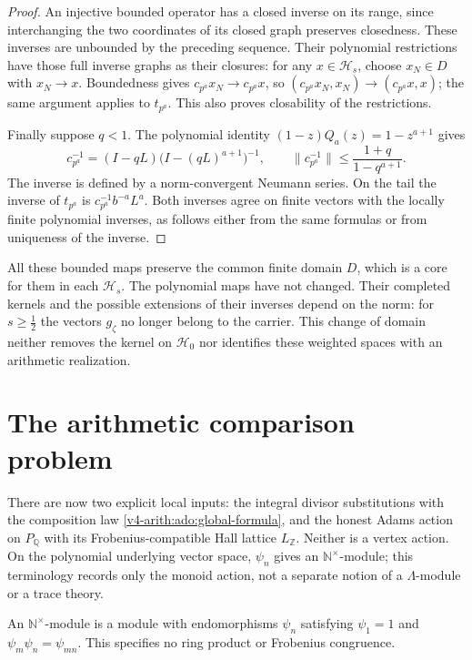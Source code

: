\begin{proof}
An injective bounded operator has a closed inverse on its range,
since interchanging the two coordinates of its closed graph preserves
closedness. These inverses are unbounded by the preceding sequence.
Their polynomial restrictions have those full inverse graphs as their
closures: for any \(x\in\mathcal H_s\), choose \(x_N\in D\) with
\(x_N\to x\). Boundedness gives \(c_{p^a}x_N\to c_{p^a}x\), so
\((c_{p^a}x_N,x_N)\to(c_{p^a}x,x)\); the same argument applies to
\(t_{p^a}\). This also proves closability of the restrictions.

Finally suppose \(q<1\). The polynomial identity
\((1-z)Q_a(z)=1-z^{a+1}\) gives
\[
 c_{p^a}^{-1}=(I-qL)\bigl(I-(qL)^{a+1}\bigr)^{-1},
 \qquad
 \|c_{p^a}^{-1}\|\le\frac{1+q}{1-q^{a+1}}.
\]
The inverse is defined by a norm-convergent Neumann series. On the
tail the inverse of \(t_{p^a}\) is
\(c_{p^a}^{-1}b^{-a}L^a\). Both inverses agree on finite vectors
with the locally finite polynomial inverses, as follows either from
the same formulas or from uniqueness of the inverse.
\end{proof}

All these bounded maps preserve the common finite domain \(D\),
which is a core for them in each \(\mathcal H_s\). The polynomial
maps have not changed. Their completed kernels and the possible
extensions of their inverses depend on the norm: for \(s\ge\tfrac12\)
the vectors \(g_\zeta\) no longer belong to the carrier. This change
of domain neither removes the kernel on \(\mathcal H_0\) nor
identifies these weighted spaces with an arithmetic realization.

\section{The arithmetic comparison problem}
\label{v4-arith:ado:arithmetic-boundary}
\label{v4-arith:gb:ring-vs-module}
\label{v4-arith:gb:descent-bost-connes}

\begin{remark}
\label{v4-arith:cor:psi-ring-hecke}
There are now two explicit local inputs: the integral divisor
substitutions with the composition law
\eqref{v4-arith:ado:global-formula}, and the honest Adams action on
\(P_{\mathbb Q}\) with its Frobenius-compatible Hall lattice
\(L_{\mathbb Z}\). Neither is a vertex action. On the polynomial
underlying vector space, \(\psi_n\) gives an
\(\mathbb N^{\times}\)-module; this terminology records only the monoid
action, not a separate notion of a \(\Lambda\)-module or a trace theory.
\end{remark}
\begin{definition}
\label{v4-arith:def:lambda-module}
An \(\mathbb N^\times\)-module is a module with endomorphisms
\(\psi_n\) satisfying \(\psi_1=1\) and \(\psi_m\psi_n=\psi_{mn}\).
This specifies no ring product or Frobenius congruence.
\end{definition}


